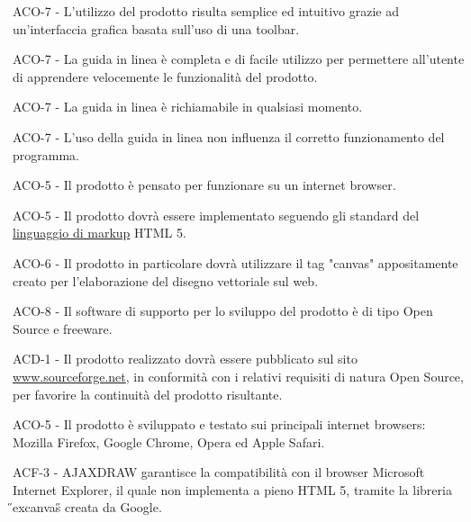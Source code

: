 

\begin{elenconumerato}{\subsubsecindent}
\item ACO-7 - L'utilizzo del prodotto risulta semplice ed intuitivo grazie ad un'interfaccia grafica basata sull'uso di una toolbar.
\item ACO-7 - La guida in linea \`e completa e di facile utilizzo per permettere all'utente di apprendere velocemente le funzionalit\`a del prodotto.
\item ACO-7 - La guida in linea \`e richiamabile in qualsiasi momento.
\item ACO-7 - L'uso della guida in linea non influenza il corretto funzionamento del programma. 
\end{elenconumerato}

\begin{elenconumerato}{\subsubsecindent}
\item ACO-5 - Il prodotto \`e pensato per funzionare su un internet browser.
\item ACO-5 - Il prodotto dovr\`a essere implementato seguendo gli standard del \underline{linguaggio di markup} HTML 5.
\item ACO-6 - Il prodotto in particolare dovr\` a utilizzare il tag "canvas" appositamente creato per l'elaborazione del disegno vettoriale sul web.
\item ACO-8 - Il software di supporto per lo sviluppo del prodotto \`e di tipo Open Source e freeware.
\item ACD-1 - Il prodotto realizzato dovr\`a essere pubblicato sul sito \href{www.sourceforge.net}{www.sourceforge.net}, in conformit\`a con i relativi requisiti di natura Open Source, per favorire la continuit\`a del prodotto risultante.
\item ACO-5 - Il prodotto \`e sviluppato e testato sui principali internet browsers: Mozilla Firefox, Google Chrome, Opera ed Apple Safari.
\end{elenconumerato}
\begin{elenconumerato}{\subsubsecindent}
\item{ACF-3 - AJAXDRAW garantisce la compatibilit\`a con il browser Microsoft Internet Explorer, il quale non implementa a pieno HTML 5, tramite la libreria \H{}excanvas\H{} creata da Google.}
\end{elenconumerato}

